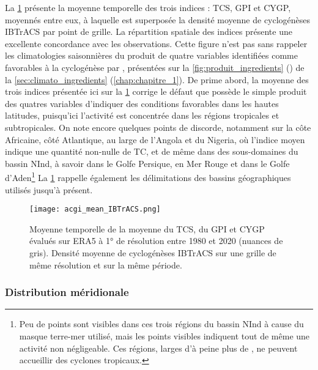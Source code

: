 \documentclass[../main.tex]{subfiles}
\begin{document}
La \cref{fig:acgi_ibt} présente la moyenne temporelle des trois indices : TCS, GPI et CYGP, moyennés entre eux, à laquelle est superposée la densité moyenne de
cyclogénèses IBTrACS par point de grille. La répartition spatiale des indices présente une excellente concordance avec les observations. Cette figure n'est pas
sans rappeler les climatologies saisonnières du produit de quatre variables identifiées comme favorables à la cyclogénèse par \textcite{gray_tropical_1975},
présentées sur la \cref{fig:produit_ingredients} () de la \cref{sec:climato_ingredients} (\cref{chap:chapitre_1}). De prime
abord, la moyenne des trois indices présentée ici sur la \cref{fig:acgi_ibt} corrige le défaut que possède le simple produit des quatres variables d'indiquer
des conditions favorables dans les hautes latitudes, puisqu'ici l'activité est concentrée dans les régions tropicales et subtropicales. On note encore quelques
points de discorde, notamment sur la côte Africaine, côté Atlantique, au large de l'Angola et du Nigeria, où l'indice moyen indique une quantité non-nulle de
TC, et de même dans des sous-domaines du bassin NInd, à savoir dans le Golfe Persique, en Mer Rouge et dans le Golfe d'Aden\footnote{Peu de points sont visibles
dans ces trois régions du bassin NInd à cause du masque terre-mer utilisé, mais les points visibles indiquent tout de même une activité non négligeable. Ces
régions, larges d'à peine plus de , ne peuvent accueillir des cyclones tropicaux.} La \cref{fig:acgi_ibt} rappelle également les délimitations des
bassins géographiques utilisés jusqu'à présent.

\begin{figure}[htpb]
    \centering
    \texttt{[image: acgi\_mean\_IBTrACS.png]}
    \caption{Moyenne temporelle de la moyenne du TCS, du GPI et CYGP évalués sur ERA5 à \ang{1} de résolution entre 1980 et 2020 (nuances de gris). Densité
    moyenne de cyclogénèses IBTrACS sur une grille de même résolution et sur la même période.}
    \label{fig:acgi_ibt}
\end{figure}

\subsubsection*{Distribution méridionale}
\end{document}
